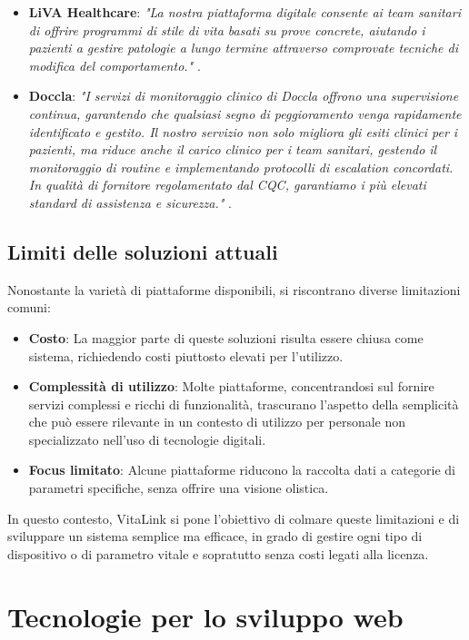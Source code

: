 \documentclass[12pt,a4paper,oneside]{report}
\begin{document}
\begin{itemize}
    \item \textbf{LiVA Healthcare}: \textit{"La nostra piattaforma digitale consente ai team sanitari di offrire programmi di stile di vita basati su prove concrete, aiutando i pazienti a gestire patologie a lungo termine attraverso comprovate tecniche di modifica del comportamento."} \cite{liva}.
    \item \textbf{Doccla}: \textit{"I servizi di monitoraggio clinico di Doccla offrono una supervisione continua, garantendo che qualsiasi segno di peggioramento venga rapidamente identificato e gestito. Il nostro servizio non solo migliora gli esiti clinici per i pazienti, ma riduce anche il carico clinico per i team sanitari, gestendo il monitoraggio di routine e implementando protocolli di escalation concordati. In qualità di fornitore regolamentato dal CQC, garantiamo i più elevati standard di assistenza e sicurezza."} \cite{doccla}.
\end{itemize}

\subsection{Limiti delle soluzioni attuali}
Nonostante la varietà di piattaforme disponibili, si riscontrano diverse limitazioni comuni:

\begin{itemize}
    \item \textbf{Costo}: La maggior parte di queste soluzioni risulta essere chiusa come sistema, richiedendo costi piuttosto elevati per l'utilizzo.
    \item \raggedright  \textbf{Complessità di utilizzo}: Molte piattaforme, concentrandosi sul fornire servizi complessi e ricchi di funzionalità, trascurano l'aspetto della semplicità che può essere rilevante in un contesto di utilizzo per personale non specializzato nell'uso di tecnologie digitali.
    \item \textbf{Focus limitato}: Alcune piattaforme riducono la raccolta dati a categorie di parametri specifiche, senza offrire una visione olistica.
\end{itemize}

In questo contesto, VitaLink si pone l'obiettivo di colmare queste limitazioni e di sviluppare un sistema semplice ma efficace, in grado di gestire ogni tipo di dispositivo o di parametro vitale e sopratutto senza costi legati alla licenza.

\section{Tecnologie per lo sviluppo web}
\end{document}
